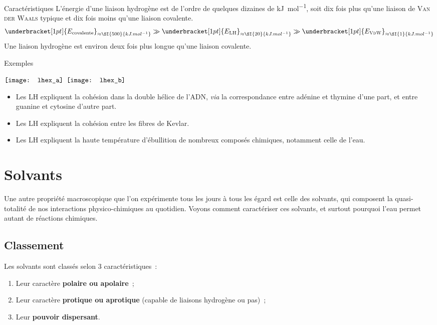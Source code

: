 \documentclass[../main/main.tex]{subfiles}
\begin{document}
\begin{tprop}{Caractéristiques}
    L'énergie d'une liaison hydrogène est de l'ordre de quelques dizaines de
    \si{kJ.mol^{-1}}, soit dix fois plus qu'une liaison de \textsc{Van der
    Waals} typique et dix fois moins qu'une liaison covalente.
    \[
        \underbracket[1pt]{E_{\text{covalente}}}_{\approx\SI{500}{kJ.mol^{-1}}}
        \gg
        \underbracket[1pt]{E_{\text{LH}}}_{\approx\SI{20}{kJ.mol^{-1}}}
        \gg
        \underbracket[1pt]{E_{\textsc{VdW}}}_{\approx\SI{1}{kJ.mol^{-1}}}
    \]
    Une liaison hydrogène est environ deux fois plus longue qu'une liaison
    covalente.
\end{tprop}

\begin{rexem}{Exemples}
    \begin{center}
        $\vcenter{\hbox{\texttt{[image: lhex\_a]}}}$
        $\vcenter{\hbox{\texttt{[image: lhex\_b]}}}$
    \end{center}
    \begin{itemize}
        \item Les LH expliquent la cohésion dans la double hélice de l'ADN,
            \textit{via} la correspondance entre adénine et thymine d'une
            part, et entre guanine et cytosine d'autre part.
        \item Les LH expliquent la cohésion entre les fibres de Kevlar.
        \item Les LH expliquent la haute température d'ébullition de nombreux
            composés chimiques, notamment celle de l'eau.
    \end{itemize}
\end{rexem}

\section{Solvants}
Une autre propriété macroscopique que l'on expérimente tous les jours à tous les
égard est celle des solvants, qui composent la quasi-totalité de nos
interactions physico-chimiques au quotidien. Voyons comment caractériser ces
solvants, et surtout pourquoi l'eau permet autant de réactions chimiques.

\subsection{Classement}
Les solvants sont classés selon 3 caractéristiques~:
\begin{enumerate}
    \item Leur caractère \textbf{polaire ou apolaire}~;
    \item Leur caractère \textbf{protique ou aprotique} (capable de
        liaisons hydrogène ou pas)~;
    \item Leur \textbf{pouvoir dispersant}.
\end{enumerate}
\end{document}
